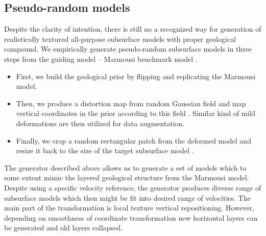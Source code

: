 \documentclass[paper,twocolomn]{geophysics}
\begin{document}
\subsection{Pseudo-random models}
Despite the clarity of intention, there is still no a recognized way for generation of realistically textured all-purpose subsurface models with proper geological compound. 
%
We empirically generate pseudo-random subsurface models in three steps from the guiding model -- Marmousi benchmark model \citep{marmousi1991}.

\begin{itemize}
\item First, we build the geological prior by flipping and replicating the Marmousi model.

\item Then, we produce a distortion map from random Gaussian field  and map vertical coordinates in the prior according to this field . Similar kind of mild deformations are then utilized for data augmentation. 


\item Finally, we crop a random rectangular patch from the deformed model and resize it back to the size of the target subsurface model .
\end{itemize} 







The generator described above allows us to generate a set of models which to some extent mimic the layered geological structure from the Marmousi model. Despite using a specific velocity reference, the generator produces diverse range of subsurface models which then might be fit into desired range of velocities. The main part of the transformation is local texture vertical repositioning. However, depending on smoothness of coordinate transformation new horizontal layers can be generated and old layers collapsed.
\end{document}
